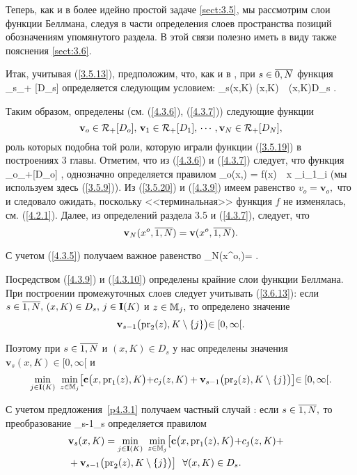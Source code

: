 Теперь, как и в более идейно простой задаче \ref{sect:3.5},
мы рассмотрим слои функции Беллмана,
следуя в части определения слоев пространства
позиций обозначениям упомянутого  раздела.
В этой связи полезно иметь
в виду также пояснения \ref{sect:3.6}.

Итак, учитывая (\ref{3.5.13}),
предположим, что, как и в
\cite[(6.12)]{Cha3`},
при
$s\in \ov{0,N}$ функция
\bfn
  \label{4.3.6`}
  _s\in \car_+ [D_s]
\efn
определяется следующим условием:
\bfn
  \label{4.3.7}
  _s(x,K) \df {}(x,K)\ \ \fa (x,K)\in D_s
  .
\efn

Таким образом, определены
(см. (\ref{4.3.6}), (\ref{4.3.7}))
следующие функции
$$
  \mathbf{v}_o\in \car_+[D_o],\,\mathbf{v}_1\in \car_+[D_1],\,\cdots,
  \mathbf{v}_N\in \car_+[D_N]
  ,
$$
роль которых подобна той роли,
которую играли функции (\ref{3.5.19})
в построениях 3 главы.
Отметим, что из (\ref{4.3.6}) и (\ref{4.3.7})
следует, что функция
\bfn
  \label{4.3.8}
  _o\in \car_+[D_o]
  ,
\efn
однозначно определяется правилом
\bfn
  \label{4.3.9}
  _o(x,\emp) = f(x)\ \ \fa x\in
  \bigcup\limits_{i\in{}\sm {}_1}_i
\efn
(мы используем здесь (\ref{3.5.9})).
Из (\ref{3.5.20}) и (\ref{4.3.9})
имеем равенство $v_o = \mathbf{v}_o,$
что и следовало ожидать,
поскольку <<терминальная>> функция $f$ не изменялась,
см. (\ref{4.2.1}).
Далее, из определений раздела 3.5 и (\ref{4.3.7}), 
следует, что
$$
  \mathbf{v}_N(x^o,\ov{1,N}) = \mathbf{v}(x^o,\ov{1,N})
  .
$$

С учетом (\ref{4.3.5}) получаем важное равенство
\bfn
  \label{4.3.10}
  _N(x^o,)= 
  .
\efn

Посредством (\ref{4.3.9}) и (\ref{4.3.10})
определены крайние слои функции Беллмана.
При построении
промежуточных слоев следует учитывать (\ref{3.6.13}):
если
$s\in\ov{1,N},\, (x,K)\in D_s,\,j\in \mathbf{I}(K)$ и
$z\in {\mathbb M}_j,$
то определено значение
$$
  \mathbf{v}_{s-1}\bigl(\mathrm{pr}_2(z),K\setminus\{j\}\bigl)\in [0,\infty[
  .
$$

Поэтому при
$s\in\ov{1,N}$ и $(x,K)\in D_s$
у нас определены значения
$\mathbf{v}_s(x,K)\in [0,\infty[$ и
$$
  \min\limits_{j\in \mathbf{I}(K)}\ \min\limits_{z\in\bbm_j}
  \bigl[\mathbf{c}\bigl(x,\mathrm{pr}_1(z),K\bigl) +
  c_j(z,K) + \mathbf{v}_{s-1}\bigl(\mathrm{pr}_2(z),K\sm\{j\}\bigl)
  \bigl]\in [0,\infty[
  .
$$

С учетом предложения~\ref{p4.3.1}
получаем частный случай \cite[предложение~6.1]{Cha3`}:
если $s\in\ov{1,N},$
то преобразование
\bfn
  \label{4.3.11}
  _{s-1}\longrightarrow {}_s
\efn
определяется правилом
\begin{eqnarray}
  &\mathbf{v}_s(x,K) =  \min\limits_{j\in \mathbf{I}(K)}\
  \min\limits_{z\in\bbm_j}\bigl[\mathbf{c}\bigl(x,\mathrm{pr}_1(z),K\bigl) +
  c_j(z,K) +
  &\nonumber\\
  &+\mathbf{v}_{s-1}\bigl(\mathrm{pr}_2(z),K\sm\{j\}\bigl)\bigl]\ \
  \fa (x,K)\in  D_s
  .
  \label{4.3.12}
\end{eqnarray}


